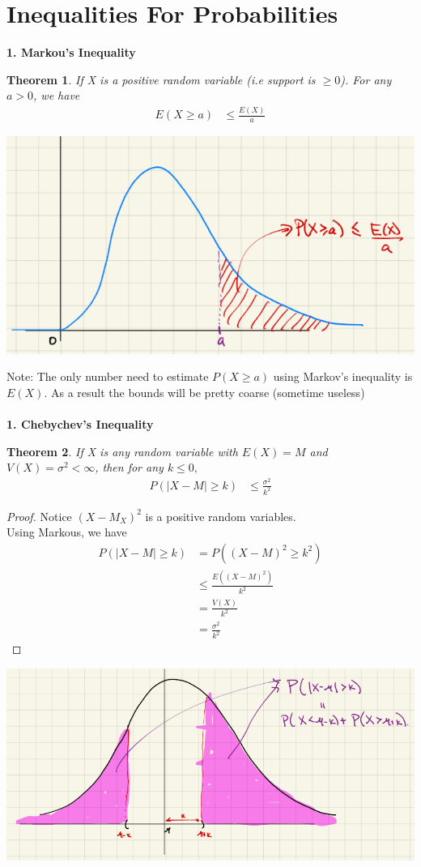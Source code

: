 \documentclass[11pt,oneside]{book}
\theoremstyle{break}
\theoremstyle{break}
\newtheorem{thm}{Theorem}[section]
\newcommand{\note}{\color{Purple}Note: \color{black}}
\begin{document}
\section[Inequalities For Probabilities]{Inequalities For Probabilities}
\textbf{1. Markou's Inequality}\\
\begin{thm}
If X is a positive random variable (i.e support is $\geq 0$). For any $a>0$, we have \begin{align*}
E(X\geq a)&\leq \frac{E(X)}{a}
\end{align*}
\end{thm}
\begin{center}
\includegraphics[scale=0.5]{figures/graph1.1}
\end{center}
\note The only number need to estimate $P(X\geq a)$ using Markov's inequality is $E(X)$. As a result the bounds will be pretty coarse (sometime useless)\\
\hfill\\
\textbf{1. Chebychev's Inequality}\\
\begin{thm}
If X is any random variable with $E(X)=M$ and $V(X)=\sigma^2<\infty$, then for any $k\leq 0,$\begin{align*}
P(|X-M|\geq k)&\leq \frac{\sigma^2}{k^2} 
\end{align*}
\end{thm}
\begin{proof}
Notice $(X-M_X)^2$ is a positive random variables.\\
Using Markous, we have \begin{align*}
P(|X-M|\geq k)&=P((X-M)^2\geq k^2)\\
&\leq \frac{E((X-M)^2)}{k^2}\\
&=\frac{V(X)}{k^2}\\
&=\frac{\sigma^2}{k^2}
\end{align*}
\end{proof}
\includegraphics[scale=0.5]{figures/chebycheus}
\end{document}
